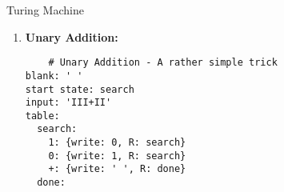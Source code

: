 \begin{task}{Turing Machine}{}{}
\begin{solution}
  \begin{enumerate}
  \item{\textbf{Unary Addition:}

    \begin{lstlisting}
    # Unary Addition - A rather simple trick
blank: ' '
start state: search
input: 'III+II'
table:
  search:
    1: {write: 0, R: search}
    0: {write: 1, R: search}
    +: {write: ' ', R: done}
  done:

    \end{lstlisting}
    

    }
  \end{enumerate}

  
\end{solution}


\end{task}



